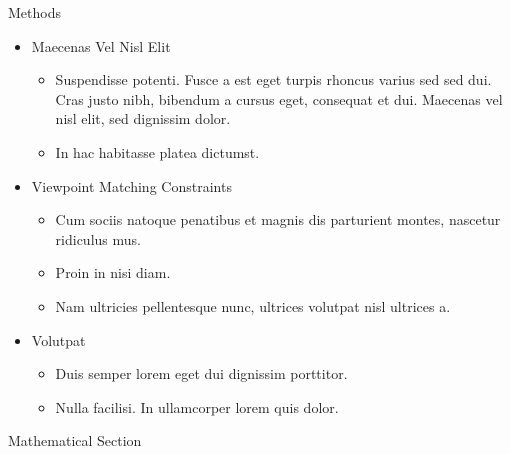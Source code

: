 {\begin{block}{Methods}
	
	\begin{itemize}
		\item Maecenas Vel Nisl Elit
		\begin{itemize}
			\item Suspendisse potenti. Fusce a est eget turpis rhoncus varius sed sed dui. Cras justo nibh, bibendum a cursus eget, consequat et dui. Maecenas vel nisl elit, sed dignissim dolor. 
			\item In hac habitasse platea dictumst.
		\end{itemize}
		
		\item Viewpoint Matching Constraints
		\begin{itemize}
			\item Cum sociis natoque penatibus et magnis dis parturient montes, nascetur ridiculus mus. 
			\item Proin in nisi diam.
			\item Nam ultricies pellentesque nunc, ultrices volutpat nisl ultrices a.
		\end{itemize}
		
		\item Volutpat 
		\begin{itemize}
			\item Duis semper lorem eget dui dignissim porttitor.
			\item Nulla facilisi. In ullamcorper lorem quis dolor.
		\end{itemize}
	\end{itemize}
	
\end{block}
\vfill

\begin{block}{Mathematical Section}
	

\end{block}}
